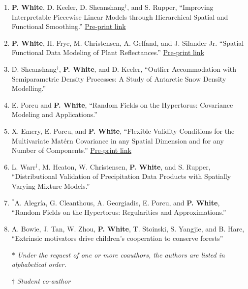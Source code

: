 \documentclass[11pt]{article}
\begin{document}
\begin{enumerate}[label=$\bullet$]
\item \textbf{P. White}, D. Keeler, D. Sheanshang$^\dagger$, and S. Rupper, ``Improving Interpretable Piecewise Linear Models through Hierarchical Spatial and Functional Smoothing.'' \href{https://arxiv.org/abs/2006.09329}{Pre-print link}
\item \textbf{P. White}, H. Frye, M. Christensen, A. Gelfand, and J. Silander Jr. ``Spatial Functional Data Modeling of Plant Reflectances.'' \href{https://arxiv.org/abs/2102.03249}{Pre-print link}
\item D. Sheanshang$^\dagger$, \textbf{P. White}, and D. Keeler, ``Outlier Accommodation with Semiparametric Density Processes: A Study of Antarctic Snow Density Modelling.''

\item  E. Porcu and \textbf{P. White}, ``Random Fields on the Hypertorus: Covariance Modeling and Applications.'' 


\item X. Emery, E. Porcu, and \textbf{P. White}, ``Flexible Validity Conditions for the Multivariate Mat\'ern Covariance in any Spatial Dimension and for any Number of Components.'' \href{https://arxiv.org/abs/2101.04235}{Pre-print link} 

\item L. Warr$^\dagger$, M. Heaton, W. Christensen, \textbf{P. White}, and S. Rupper, ``Distributional Validation of Precipitation Data Products with Spatially Varying Mixture Models.''

\item $^*$A. Alegr\'ia, G. Cleanthous, A. Georgiadis, E. Porcu, and \textbf{P. White}, ``Random Fields on the Hypertorus: Regularities and Approximations.'' 


\item A. Bowie, J. Tan, W. Zhou, \textbf{P. White}, T. Stoinski, S. Yangjie, and B. Hare, ``Extrinsic motivators drive children’s cooperation to conserve forests'' 
\setlength\itemsep{-1em} \\
\item[$*$] \textit{Under the request of one or more coauthors, the authors are listed in alphabetical order.}\\
\item[$\dagger$] \textit{Student co-author}
\end{enumerate}
\end{document}
